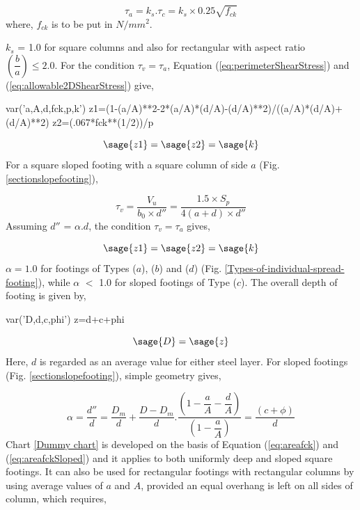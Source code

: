\documentclass{report}
\newcommand{\figmacro}[1] {Fig. #1}
\newcommand{\equmacro}[1] {Equation #1}
\newcommand{\chartmacro}[1] {Chart #1}
\begin{document}

\begin{equation}
\label{eq:allowable2DShearStress}
\tau_{a} = k_{s} . \tau_{c} = k_{s} \times 0.25 \sqrt{f_{ck}}
\end{equation}
where, $f_{ck}$ is to be put in $N/mm^2$.

$k_{s}$ = 1.0 for square columns and also for rectangular with aspect ratio
$\left( \dfrac{b}{a} \right) \leq {2.0}$. For the condition $\tau_{v} =
\tau_{a}$, \equmacro (\ref{eq:perimeterShearStress}) and
(\ref{eq:allowable2DShearStress}) give,

\begin{sagesilent}
  var('a,A,d,fck,p,k')
  z1=(1-(a/A)**2-2*(a/A)*(d/A)-(d/A)**2)/((a/A)*(d/A)+(d/A)**2)
  z2=(.067*fck**(1/2))/p
\end{sagesilent}

\begin{equation}
  \label{eq:areafck}
  \sage{z1}=\sage{z2}=\sage{k}
\end{equation}
For a square sloped footing with a square column of side $a$ (\figmacro \ref{sectionslopefooting}),
 
\begin{equation}
\label{eq:shearSquare}
\tau_{v} = \frac{V_{u}}{b_{0} \times d''}
=\frac{1.5 \times {S_p}}{4(a + d) \times d''}
\end{equation}
Assuming $d''$ = $ \alpha . d $, the condition $\tau_{v} = \tau_{a}$ gives,

\begin{equation} 
 \label{eq:areafckSloped}
  \sage{z1}=\sage{z2}=\sage{k}                                   
\end{equation} 
$\alpha = 1.0$ for footings of Types ($a$), ($b$) and ($d$) (\figmacro \ref{Types-of-individual-spread-footing}),
while $\alpha$ $<$ 1.0 for sloped footings of Type ($c$). The overall depth
of footing is given by,

\begin{sagesilent}
  var('D,d,c,phi')
  z=d+c+phi
\end{sagesilent}

\begin{equation}
  \label{eq:depth-cover}
  \sage{D}=\sage{z}
\end{equation}
Here, $d$ is regarded as an average value for either steel layer. For sloped
footings  (\figmacro \ref{sectionslopefooting}), simple geometry gives,

\begin{equation}
\label{eq:shape}
\alpha = \frac{d''}{d} = \frac{{D_m}}{d} + \frac{D - {D_m}}{d}.
\frac{\left(1 - \dfrac{a}{A} - \dfrac{d}{A}\right)}
{\left(1 - \dfrac{a}{A}\right)}=\dfrac{(c+\phi)}{d}
\end{equation}
\chartmacro \ref{Dummy chart} is developed on the basis of \equmacro (\ref{eq:areafck}) and (\ref{eq:areafckSloped}) and it
applies to both uniformly deep and sloped square footings. It can also be
used for rectangular footings with rectangular columns by using average
values of $a$ and $A$, provided an equal overhang is left on all sides of
column, which requires,
\end{document}
